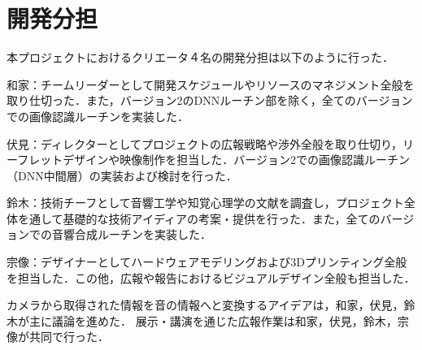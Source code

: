 \section{開発分担}%
本プロジェクトにおけるクリエータ４名の開発分担は以下のように行った．

和家：チームリーダーとして開発スケジュールやリソースのマネジメント全般を取り仕切った．また，バージョン2のDNNルーチン部を除く，全てのバージョンでの画像認識ルーチンを実装した．

伏見：ディレクターとしてプロジェクトの広報戦略や渉外全般を取り仕切り，リーフレットデザインや映像制作を担当した．バージョン2での画像認識ルーチン（DNN中間層）の実装および検討を行った．

鈴木：技術チーフとして音響工学や知覚心理学の文献を調査し，プロジェクト全体を通して基礎的な技術アイディアの考案・提供を行った．また，全てのバージョンでの音響合成ルーチンを実装した．

宗像：デザイナーとしてハードウェアモデリングおよび3Dプリンティング全般を担当した．この他，広報や報告におけるビジュアルデザイン全般も担当した．

カメラから取得された情報を音の情報へと変換するアイデアは，和家，伏見，鈴木が主に議論を進めた．
展示・講演を通じた広報作業は和家，伏見，鈴木，宗像が共同で行った．

